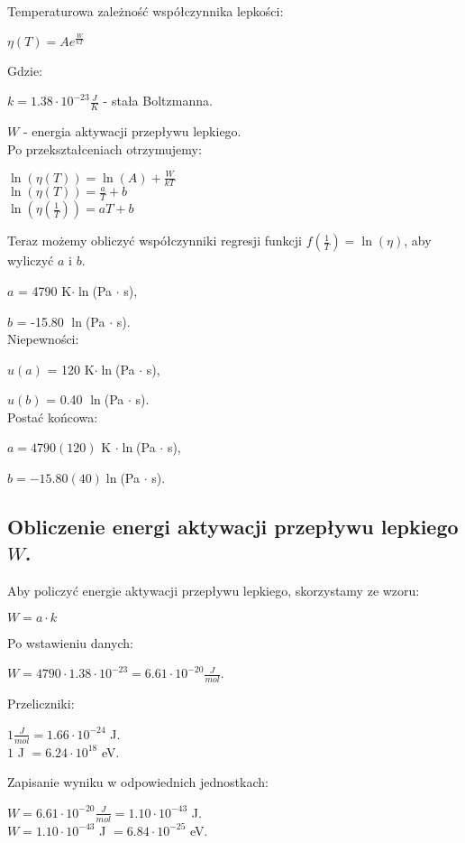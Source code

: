 \documentclass[12pt]{article}
\begin{document}
Temperaturowa zależność współczynnika lepkości:
\begin{center}
    $ \eta(T) = Ae^{\frac{W}{kT}}$
\end{center}
Gdzie:

$k = 1.38 \cdot 10^{-23} \frac{J}{K}$ - stała Boltzmanna.

$W$ - energia aktywacji przepływu lepkiego. \\
Po przekształceniach otrzymujemy:
\begin{center}
    $ \ln(\eta(T)) = \ln(A) + \frac{W}{kT}$ \\
    $ \ln(\eta(T)) = \frac{a}{T} + b$ \\
    $ \ln(\eta(\frac{1}{T})) = aT + b$
\end{center}
Teraz możemy obliczyć współczynniki regresji funkcji
$f(\frac{1}{T}) = \ln(\eta)$, aby \\
wyliczyć $a$ i $b$.

$a$ = 4790 K$\cdot \ln$(Pa $\cdot$ s),

$b$ = -15.80 $\ln$(Pa $\cdot$ s). \\
Niepewności:

$u(a)$ = 120 K$\cdot \ln$(Pa $\cdot$ s),

$u(b)$ = 0.40 $\ln$(Pa $\cdot$ s). \\
Postać końcowa:

$a = 4790(120)$ K $\cdot \ln$(Pa $\cdot$ s),

$b = -15.80(40) \ln$(Pa $\cdot$ s).

\subsection*{Obliczenie energi aktywacji przepływu lepkiego $W$.}
Aby policzyć energie aktywacji przepływu lepkiego, skorzystamy ze wzoru:
\begin{center}
    $W = a \cdot k$
\end{center}
Po wstawieniu danych:
\begin{center}
    $W = 4790 \cdot 1.38 \cdot 10^{-23} = 6.61 \cdot 10^{-20} \frac{J}{mol}$.
\end{center}
Przeliczniki:
\begin{center}
    $1 \frac{J}{mol} = 1.66 \cdot 10^{-24}$ J. \\
    $1$ J $ = 6.24 \cdot 10^{18}$ eV.
\end{center}
Zapisanie wyniku w odpowiednich jednostkach:
\begin{center}
    $W = 6.61 \cdot 10^{-20} \frac{J}{mol} = 1.10 \cdot 10^{-43}$ J. \\
    $W = 1.10 \cdot 10^{-43}$ J $ = 6.84 \cdot 10^{-25}$ eV.
\end{center}
\end{document}
